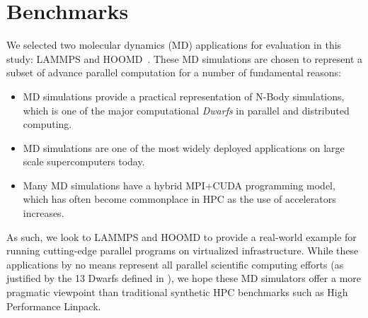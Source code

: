 



\section{Benchmarks}
We selected two molecular dynamics (MD) applications for evaluation in this study:
LAMMPS and HOOMD~\cite{plimpton2007lammps,anderson2010hoomd}.  These MD simulations are chosen to represent a subset of advance parallel computation for a number of fundamental reasons:

\begin{itemize}
\item MD simulations provide a practical representation of N-Body simulations, which is one of the major computational \emph{Dwarfs} \cite{asanovic2006landscape} in parallel and distributed computing. 
\item MD simulations are one of the most widely deployed applications on large scale supercomputers today.
\item Many MD simulations have a hybrid MPI+CUDA programming model, which has often become commonplace in HPC as the use of accelerators increases.
\end{itemize}

As such, we look to LAMMPS and HOOMD to provide a real-world example for running cutting-edge parallel programs on virtualized infrastructure. While these applications by no means represent all parallel scientific computing efforts (as justified by the 13 Dwarfs defined in \cite{asanovic2006landscape}), we hope these MD simulators offer a more pragmatic viewpoint than traditional synthetic HPC benchmarks such as High Performance Linpack. 

